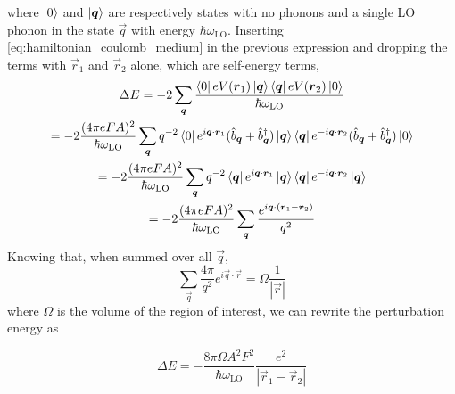 where $\ket{0}$ and $\ket{\mathbf{\boldsymbol{q}}}$ are respectively states with no phonons and a single LO phonon in the state $\vec{q}$ with energy $\hbar\omega_\text{LO}$. Inserting \cref{eq:hamiltonian_coulomb_medium} in the previous expression and dropping the terms with $\vec{r}_1$ and $\vec{r}_2$ alone, which are self-energy terms,
\begin{multline}
    \Delta E = -2\sum_{\mathbf{\boldsymbol{q}}} \frac{\bra{0}eV(\mathbf{\boldsymbol{r}}_1)\ket{\mathbf{\boldsymbol{q}}}\bra{\mathbf{\boldsymbol{q}}}eV(\mathbf{\boldsymbol{r}}_2)\ket{0}}{\hbar\omega_\text{LO}}
    \\ = -2 \frac{(4\pi eFA)^2}{\hbar \omega_\text{LO}} \sum_{\mathbf{\boldsymbol{q}}} q^{-2} \bra{0}e^{i\mathbf{\boldsymbol{q}}\cdot\mathbf{\boldsymbol{r}}_1}(\hat{b}_{\mathbf{\boldsymbol{q}}} + \hat{b}^\dagger_{\mathbf{\boldsymbol{q}}})\ket{\mathbf{\boldsymbol{q}}}\bra{\mathbf{\boldsymbol{q}}}e^{-i\mathbf{\boldsymbol{q}}\cdot\mathbf{\boldsymbol{r}}_2}(\hat{b}_{\mathbf{\boldsymbol{q}}} + \hat{b}^\dagger_{\mathbf{\boldsymbol{q}}})\ket{0}
    \\ = - 2 \frac{(4\pi eFA)^2}{\hbar \omega_\text{LO}} \sum_{\mathbf{\boldsymbol{q}}} q^{-2} \bra{\mathbf{\boldsymbol{q}}}e^{i\mathbf{\boldsymbol{q}}\cdot\mathbf{\boldsymbol{r}}_1}\ket{\mathbf{\boldsymbol{q}}}\bra{\mathbf{\boldsymbol{q}}}e^{-i\mathbf{\boldsymbol{q}}\cdot\mathbf{\boldsymbol{r}}_2}\ket{\mathbf{\boldsymbol{q}}}
    \\ = - 2 \frac{(4\pi eFA)^2}{\hbar \omega_\text{LO}} \sum_{\mathbf{\boldsymbol{q}}}\frac{e^{i\mathbf{\boldsymbol{q}}\cdot(\mathbf{\boldsymbol{r}}_1 - \mathbf{\boldsymbol{r}}_2)}}{q^2}
\end{multline}
Knowing that, when summed over all $\vec{q}$,
\begin{equation}
    \sum_\vec{q} \frac{4\pi}{q^2} e^{i\vec{q}\cdot \vec{r}} = \Omega \frac{1}{|\vec{r}|}
\end{equation}
where $\Omega$ is the volume of the region of interest, we can rewrite the perturbation energy as

\begin{equation}
    \Delta E = - \frac{8\pi \Omega A^2 F^2}{\hbar \omega_\text{LO}} \frac{e^2}{|\vec{r}_1 - \vec{r}_2|}
\end{equation}

